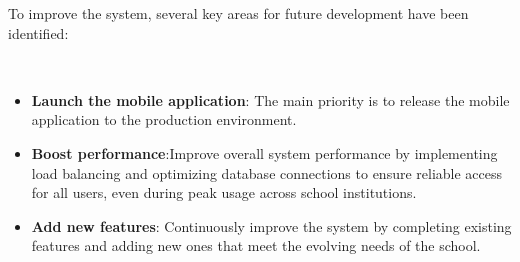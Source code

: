 \begin{minipage}{\textwidth}
    \setlength{\parindent}{2em}
    To improve the system, several key areas for future development have been identified:
\end{minipage}\\
\vspace{-0.5cm}
\begin{itemize}[itemsep=-0.05cm]
    \item \textbf{Launch the mobile application}: The main priority is to release the mobile application to the production environment.
    \item \textbf{Boost performance}:Improve overall system performance by implementing load balancing and optimizing database connections to ensure reliable access for all users, even during peak usage across school institutions.
    \item \textbf{Add new features}: Continuously improve the system by completing existing features and adding new ones that meet the evolving needs of the school.
\end{itemize}
